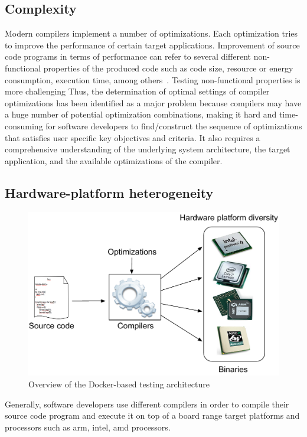 \subsection{Complexity}
Modern compilers implement a number of optimizations. Each optimization tries to improve the performance of certain target applications. Improvement of source code programs in terms of performance can refer to several different non-functional properties of the produced code such as code size, resource or energy consumption, execution time, among others~\cite{almagor2004finding,pan2006fast}.
Testing non-functional properties is more challenging 
Thus, the determination of optimal settings of compiler optimizations has been identified as a major problem because compilers may have a huge number of potential optimization combinations, making it hard and time-consuming for software developers to find/construct the sequence of optimizations that satisfies user specific key objectives and criteria. It also requires a comprehensive understanding of the underlying system architecture, the target application, and the available optimizations of the compiler.
\subsection{Hardware-platform heterogeneity}
\begin{figure}[h]
	\center
	\includegraphics[scale=0.65]{Background/fig/hardware-diversity.pdf}
	\caption{Overview of the Docker-based testing architecture}
\end{figure}
Generally, software developers use different compilers in order to compile their source code program and execute it on top of a board range target platforms and processors such as arm, intel, amd processors. 

